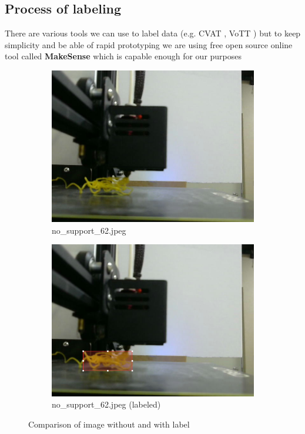 \documentclass[12pt,a4paper]{article}
\begin{document}
\subsection{Process of labeling}
 There are various tools we can use to label data (e.g. CVAT{ \scriptsize \cite{labelingTool1}}, VoTT{ \scriptsize \cite{labelingTool2}}) but to keep simplicity and be able of rapid prototyping we are using free open source online tool called {\textbf {MakeSense}}{ \scriptsize \cite{labelingTool3}} which is capable enough for our purposes 
 \begin{figure}[h]
    \centering
    \begin{subfigure}[b]{0.45\textwidth}
        \centering
        \includegraphics[width=\textwidth]{no_support_62.jpg}
        \caption{no\_support\_62.jpeg \cite{onlineOpenSource2}}
        \label{fig:image1}
    \end{subfigure}
    \begin{subfigure}[b]{0.45\textwidth}
        \centering
        \includegraphics[width=\textwidth]{LabelByMakeSens.png}
        \caption{no\_support\_62.jpeg (labeled)\cite{onlineOpenSource2}}
        \label{fig:image2}
    \end{subfigure}
    \hfill

    \caption{Comparison of image without and with label}
    \label{fig:test}
\end{figure}
\end{document}
